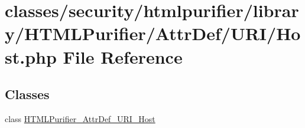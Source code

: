 \hypertarget{Host_8php}{\section{classes/security/htmlpurifier/library/\+H\+T\+M\+L\+Purifier/\+Attr\+Def/\+U\+R\+I/\+Host.php File Reference}
\label{Host_8php}
}
\subsection*{Classes}
\begin{DoxyCompactItemize}
\item 
class \hyperlink{classHTMLPurifier__AttrDef__URI__Host}{H\+T\+M\+L\+Purifier\+\_\+\+Attr\+Def\+\_\+\+U\+R\+I\+\_\+\+Host}
\end{DoxyCompactItemize}
